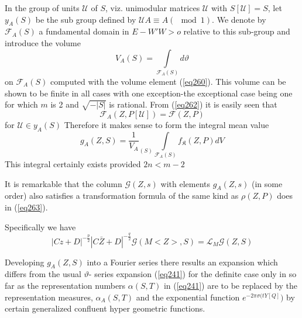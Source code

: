 In the group of units $\mathcal{U}$ of $S$, viz. unimodular matrices
$\mathcal{U}$ with $S[\mathcal{U}]=S$, let $y_A(S)$ be the sub
group defined by $\mathcal{U}A \equiv A(\mod 1)$. We denote by
$\mathcal{F}_A(S)$ a fundamental domain in $E-W'W >o$ relative to this
sub-group and introduce the volume 
\begin{equation*}
V_A(S)=\int \limits_{\mathcal{F}_A(S)}d \vartheta \tag{264}\label{eq264}
\end{equation*}
on $\mathcal{F}_A(S)$ computed with the volume element (\ref{eq260}). This
volume can be shown to be finite in all cases with one exception-the
exceptional case being one for which $m$ is 2 and $\sqrt{-|S|}$ is
rational. From (\ref{eq262}) it is easily seen that 
\begin{equation*}
\mathcal{F}_A(Z,P[\mathcal{U}])=\mathcal{F}(Z,P) \tag{265}\label{eq265} 
\end{equation*}
for $\mathcal{U} \in y_A (S)$ Therefore it makes sense to  form
\pageoriginale the integral mean value 
\begin{equation*}
g_A (Z,
S)=\frac{1}{V_A}_{(S)} \int\limits_{\mathcal{F}_A(S)}
f_\mathfrak{K}(Z,P)d V \tag{266}\label{eq266}   
\end{equation*}
This integral certainly exists provided $2 n < m-2$ 

It is remarkable that the column $\mathscr{G}(Z,s)$ with elements
$g_A(Z,s)$ (in some order) also satisfies a transformation formula of
the same kind as $\rho (Z,P)$ does in (\ref{eq263}). 

Specifically we have 
\begin{equation*}
|Cz+D|^{-\frac{p}{2}}|C\bar{Z}+D|^{-\frac{q}{2}}\mathscr{G}(M
<Z>,S)=\mathscr{L}_M \mathscr{G} (Z,S) \tag{267}\label{eq267}  
\end{equation*}

Developing $g_A(Z,S)$ into a Fourier series there results an expansion
which differs from the usual $\vartheta$- series expansion (\ref{eq241}) for
the definite case only in so far as the representation numbers
$\alpha(S,T)$ \qquad in (\ref{eq241}) are to be replaced by the
representation measures, $\alpha_A(S,T)$ and the exponential function
$e^{-2 \pi \sigma (t Y [Q]})$ by certain generalized confluent hyper
geometric functions. 

